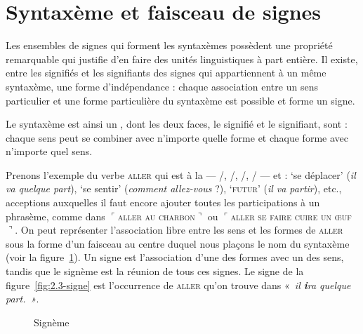 \section{Syntaxème et faisceau de signes}\label{sec:2.3.17}\largerpage

Les ensembles de signes qui forment les syntaxèmes possèdent une propriété remarquable qui justifie d’en faire des unités linguistiques à part entière. Il existe, entre les signifiés et les signifiants des signes qui appartiennent à un même syntaxème, une forme d’indépendance : chaque association entre un sens particulier et une forme particulière du syntaxème est possible et forme un signe.

{Le syntaxème est ainsi un , dont les deux faces, le signifié et le signifiant, sont : chaque sens peut se combiner avec n’importe quelle forme et chaque forme avec n’importe quel sens.}

Prenons l’exemple du verbe \textsc{aller} qui est à la  — /, /, /, / — et  : ‘se déplacer’ (\textit{il va quelque part}), ‘se sentir’ (\textit{comment allez-vous} ?), ‘\textsc{futur}’ (\textit{il va partir}), etc., acceptions auxquelles il faut encore ajouter toutes les participations à un phrasème, comme dans $⌜$\textsc{aller} \textsc{au} \textsc{charbon}$⌝$ ou $⌜$\textsc{aller} \textsc{se} \textsc{faire} \textsc{cuire} \textsc{un} \textsc{œuf}$⌝$. On peut représenter l’association libre entre les sens et les formes de \textsc{aller} sous la forme d’un faisceau au centre duquel nous plaçons le nom du syntaxème (voir la figure~\ref{fig:2.3-signeme}). Un signe est l’association d’une des formes avec un des sens, tandis que le signème est la réunion de tous ces signes. Le signe de la figure~\ref{fig:2.3-signe} est l'occurrence de \textsc{aller} qu'on trouve dans «~\textit{il \textbf{i}ra quelque part.~»}.


\begin{figure}
\caption{Signème\label{fig:2.3-signeme}}
\end{figure}

